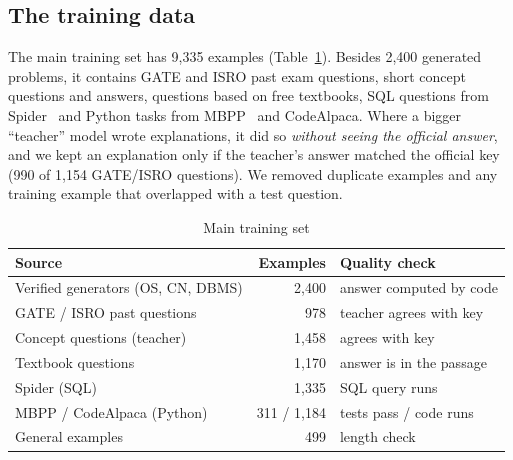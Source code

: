 \documentclass[conference]{IEEEtran}
\begin{document}
\noindent{}

\subsection{The training data}
The main training set has 9,335 examples (Table~\ref{tab:mix}). Besides 2,400 generated problems, it contains GATE and ISRO past exam questions, short concept questions and answers, questions based on free textbooks, SQL questions from Spider~\cite{spider} and Python tasks from MBPP~\cite{mbpp} and CodeAlpaca. Where a bigger ``teacher'' model wrote explanations, it did so \emph{without seeing the official answer}, and we kept an explanation only if the teacher's answer matched the official key (990 of 1,154 GATE/ISRO questions). We removed duplicate examples and any training example that overlapped with a test question.

\begin{table}[t]
\centering
\caption{Main training set}
\label{tab:mix}
\begin{tabular}{@{}l r l@{}}
\toprule
Source & Examples & Quality check \\
\midrule
Verified generators (OS, CN, DBMS) & 2,400 & answer computed by code \\
GATE / ISRO past questions & 978 & teacher agrees with key \\
Concept questions (teacher) & 1,458 & agrees with key \\
Textbook questions & 1,170 & answer is in the passage \\
Spider (SQL) & 1,335 & SQL query runs \\
MBPP / CodeAlpaca (Python) & 311 / 1,184 & tests pass / code runs \\
General examples & 499 & length check \\
\bottomrule
\end{tabular}
\end{table}
\end{document}
